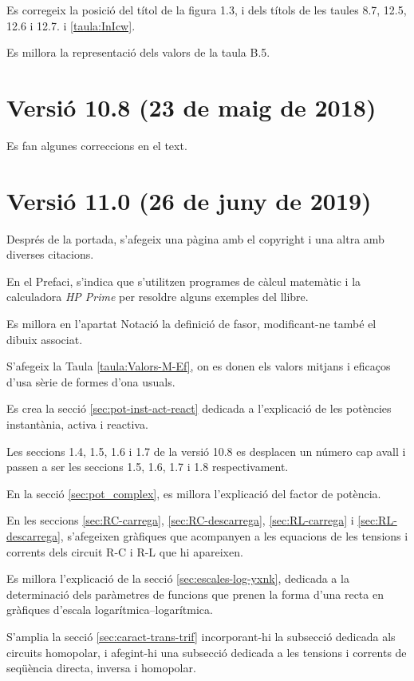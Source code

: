 Es corregeix la posició del títol de la figura 1.3, i dels títols de les taules 8.7, 12.5, 12.6 i 12.7.
i \ref{taula:InIcw}.

Es millora la representació dels valors de la taula B.5.

\section*{Versió 10.8 (23 de maig de 2018)}

Es fan algunes correccions en el text.


\section*{Versió 11.0 (26 de juny de 2019)}

Després de la portada, s'afegeix una pàgina amb el copyright i una altra amb diverses citacions.

En el Prefaci, s'indica que s’utilitzen programes de càlcul matemàtic i la calculadora \emph{HP Prime}
per resoldre alguns  exemples del llibre.

Es millora en l'apartat Notació la definició de  fasor, modificant-ne també el dibuix associat.

S'afegeix la Taula \ref{taula:Valors-M-Ef}, on es donen els valors mitjans i eficaços d'usa sèrie de formes d'ona usuals.

Es crea la secció \ref{sec:pot-inst-act-react} dedicada a l'explicació de  les potències instantània, activa i reactiva.

Les seccions 1.4, 1.5, 1.6 i 1.7 de la versió 10.8 es desplacen un número cap
avall i passen a ser les seccions 1.5, 1.6, 1.7 i 1.8 respectivament.

En la secció \ref{sec:pot_complex}, es millora l'explicació del factor de potència.

En les seccions \ref{sec:RC-carrega}, \ref{sec:RC-descarrega}, \ref{sec:RL-carrega} i \ref{sec:RL-descarrega}, s'afegeixen gràfiques que acompanyen a les equacions de les tensions i corrents  dels circuit R-C i R-L que hi apareixen.

Es millora l'explicació de  la secció \ref{sec:escales-log-yxnk}, dedicada
a la determinació dels paràmetres de funcions que prenen la forma d’una recta en gràfiques d’escala
logarítmica–logarítmica.

S'amplia la secció \ref{sec:caract-trans-trif} incorporant-hi la subsecció dedicada als circuits homopolar, i afegint-hi una subsecció dedicada a les tensions i corrents de seqüència directa, inversa i homopolar.

